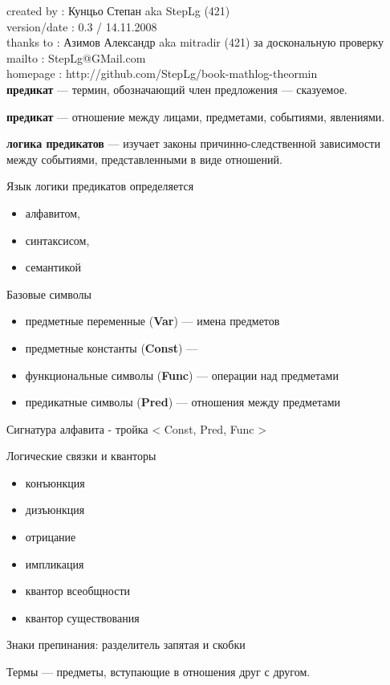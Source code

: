 \documentclass[a4paper,12pt]{article}
\begin{document}
created by : Кунцьо Степан aka StepLg (421) \\
version/date : 0.3 / 14.11.2008 \\
thanks to : Азимов Александр aka mitradir (421) за доскональную проверку \\
mailto : StepLg@GMail.com \\
homepage : http://github.com/StepLg/book-mathlog-theormin \\

\textbf{предикат} --- термин, обозначающий член предложения --- сказуемое.

\textbf{предикат} --- отношение между лицами, предметами, событиями, явлениями.

\textbf{логика предикатов} --- изучает законы причинно-следственной зависимости между событиями, представленными в виде отношений.

Язык логики предикатов определяется
\begin{itemize}
 \item алфавитом,
 \item синтаксисом,
 \item семантикой
\end{itemize}

Базовые символы
\begin{itemize}
 \item предметные переменные (\textbf{Var}) --- имена предметов
 \item предметные константы (\textbf{Const}) ---
 \item функциональные символы (\textbf{Func}) --- операции над предметами
 \item предикатные символы (\textbf{Pred}) --- отношения между предметами
\end{itemize}

Сигнатура алфавита - тройка < Const, Pred, Func >

Логические связки и кванторы
\begin{itemize}
 \item конъюнкция
 \item дизъюнкция
 \item отрицание
 \item импликация
 \item квантор всеобщности
 \item квантор существования
\end{itemize}

Знаки препинания: разделитель запятая и скобки

Термы --- предметы, вступающие в отношения друг с другом.
\end{document}
